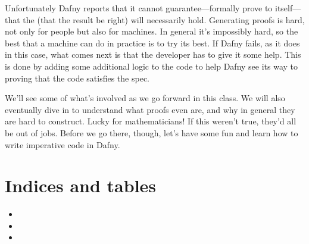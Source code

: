 \documentclass[letterpaper,10pt,english]{sphinxmanual}
\begin{document}
\begin{sphinxVerbatim}[commandchars=\\\{\}]
     
    
     
   
       
     
     
      
          
          
    
\end{sphinxVerbatim}

Unfortunately Dafny reports that it cannot guarantee—formally prove
to itself—that the  (that the result be right) will
necessarily hold. Generating proofs is hard, not only for people but
also for machines. In general it’s impossibly hard, so the best that a
machine can do in practice is to try its best. If Dafny fails, as it
does in this case, what comes next is that the developer has to give
it some help. This is done by adding some additional logic to the code
to help Dafny see its way to proving that the code satisfies the spec.

We’ll see some of what’s involved as we go forward in this class. We
will also eventually dive in to understand what proofs even are, and
why in general they are hard to construct. Lucky for mathematicians!
If this weren’t true, they’d all be out of jobs. Before we go there,
though, let’s have some fun and learn how to write imperative code in
Dafny.


\chapter{Indices and tables}
\label{\detokenize{index:indices-and-tables}}\begin{itemize}
\item {} 

\item {} 

\item {} 

\end{itemize}



\renewcommand{\indexname}{Index}
\printindex
\end{document}
